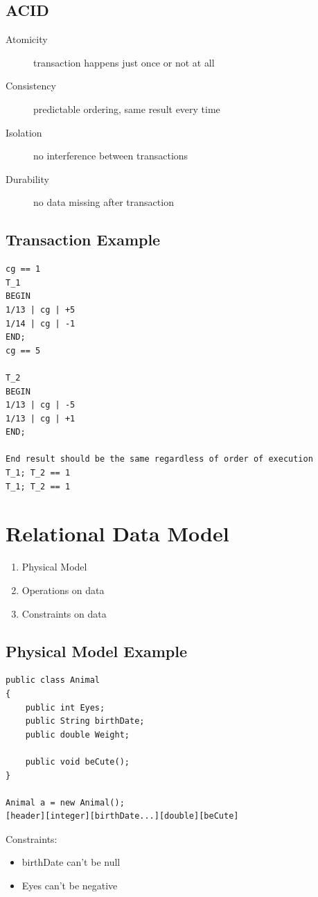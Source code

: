 \documentclass{article}
\begin{document}
\subsection{ACID}
\begin{samepage}
\begin{description}
    \item[Atomicity] transaction happens just once or not at all
    \item[Consistency] predictable ordering, same result every time
    \item[Isolation] no interference between transactions 
    \item[Durability] no data missing after transaction
\end{description}
\end{samepage}

\subsection{Transaction Example}
\begin{verbatim}
cg == 1
T_1
BEGIN
1/13 | cg | +5
1/14 | cg | -1
END;
cg == 5

T_2
BEGIN
1/13 | cg | -5
1/13 | cg | +1
END;

End result should be the same regardless of order of execution
T_1; T_2 == 1
T_1; T_2 == 1

\end{verbatim}

\section{Relational Data Model}
\begin{enumerate}
    \item{Physical Model}
    \item{Operations on data}
    \item{Constraints on data}
\end{enumerate}

\subsection{Physical Model Example}
\begin{samepage}
\begin{lstlisting}
public class Animal
{
    public int Eyes;
    public String birthDate;
    public double Weight;

    public void beCute();
}

Animal a = new Animal();
[header][integer][birthDate...][double][beCute]
\end{lstlisting}

Constraints:
\begin{itemize}
    \item{birthDate can't be null}
    \item{Eyes can't be negative}
\end{itemize}
\end{samepage}
\end{document}
